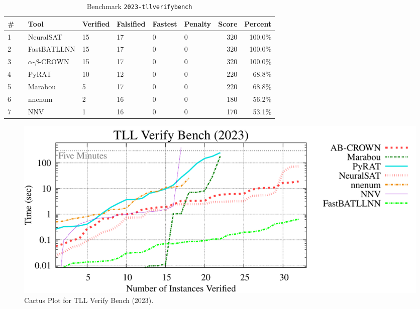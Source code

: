 
\begin{table}[h]
\begin{center}
\caption{Benchmark \texttt{2023-tllverifybench}} \label{tab:cat_{cat}}
{\setlength{\tabcolsep}{2pt}
\begin{tabular}[h]{@{}llllllrr@{}}
\toprule
\textbf{\# ~} & \textbf{Tool} & \textbf{Verified} & \textbf{Falsified} & \textbf{Fastest} & \textbf{Penalty} & \textbf{Score} & \textbf{Percent}\\
\midrule
1 & NeuralSAT & 15 & 17 & 0 & 0 & 320 & 100.0\% \\
2 & FastBATLLNN & 15 & 17 & 0 & 0 & 320 & 100.0\% \\
3 & $\alpha$-$\beta$-CROWN & 15 & 17 & 0 & 0 & 320 & 100.0\% \\
4 & PyRAT & 10 & 12 & 0 & 0 & 220 & 68.8\% \\
5 & Marabou & 5 & 17 & 0 & 0 & 220 & 68.8\% \\
6 & nnenum & 2 & 16 & 0 & 0 & 180 & 56.2\% \\
7 & NNV & 1 & 16 & 0 & 0 & 170 & 53.1\% \\
\bottomrule
\end{tabular}
}
\end{center}
\end{table}



\begin{figure}[h]
\centerline{\includegraphics[width=\textwidth]{cactus/2023_tllverifybench.pdf}}
\caption{Cactus Plot for TLL Verify Bench (2023).}
\label{fig:quantPic}
\end{figure}



